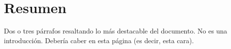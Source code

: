 
\chapter{Resumen}

Dos o tres párrafos resaltando lo más destacable del documento. No es una
introducción. Debería caber en esta página (es decir, esta cara).

